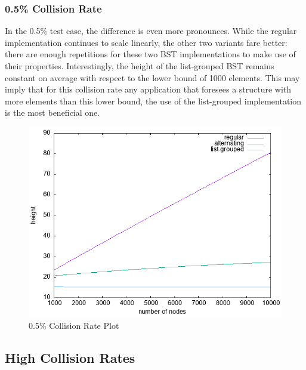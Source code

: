 \documentclass[fleqn,10pt]{SelfArx} %
\begin{document}
\subsubsection{0.5\% Collision Rate}
In the 0.5\% test case, the difference is even more pronounces. While the regular implementation continues to scale linearly, the other two variants fare better: there are enough repetitions for these two BST implementations to make use of their properties. Interestingly, the height of the list-grouped BST remains constant on average with respect to the lower bound of 1000 elements. This may imply that for this collision rate any application that foresees a structure with more elements than this lower bound, the use of the list-grouped implementation is the most beneficial one.

\begin{figure}[ht]\centering
	\includegraphics[width=\linewidth]{Figures/0.5_plot.png}
	\caption{0.5\% Collision Rate Plot}
	\label{fig:0.5_plot}
\end{figure}

\subsection{High Collision Rates}
\end{document}
